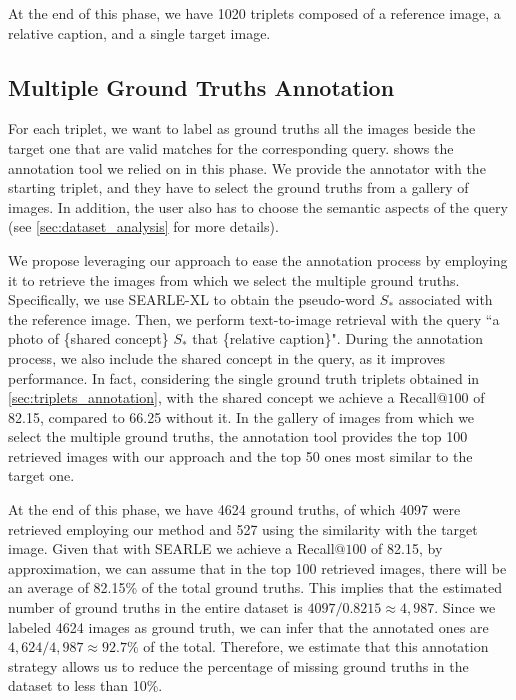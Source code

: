 \documentclass[10pt,twocolumn,letterpaper]{article}
\newcommand{\method}{SEARLE\xspace}
\begin{document}
At the end of this phase, we have 1020 triplets composed of a reference image, a relative caption, and a single target image.

\subsection{Multiple Ground Truths Annotation}\label{sec:multiple_gt_annotation}
For each triplet, we want to label as ground truths all the images beside the target one that are valid matches for the corresponding query.  shows the annotation tool we relied on in this phase. We provide the annotator with the starting triplet, and they have to select the ground truths from a gallery of images. In addition, the user also has to choose the semantic aspects of the query (see \cref{sec:dataset_analysis} for more details).

We propose leveraging our approach to ease the annotation process by employing it to retrieve the images from which we select the multiple ground truths.
Specifically, we use \method-XL to obtain the pseudo-word $S_*$ associated with the reference image. Then, we perform text-to-image retrieval with the query ``a photo of \{shared concept\} $S_*$ that \{relative caption\}". During the annotation process, we also include the shared concept in the query, as it improves performance. In fact, considering the single ground truth triplets obtained in \cref{sec:triplets_annotation}, with the shared concept we achieve a Recall$@100$ of 82.15, compared to 66.25 without it. In the gallery of images from which we select the multiple ground truths, the annotation tool provides the top 100 retrieved images with our approach and the top 50 ones most similar to the target one.

At the end of this phase, we have 4624 ground truths, of which 4097 were retrieved employing our method and 527 using the similarity with the target image. Given that with \method we achieve a Recall$@100$ of 82.15, by approximation, we can assume that in the top 100 retrieved images, there will be an average of 82.15\% of the total ground truths. This implies that the estimated number of ground truths in the entire dataset is $4097 / 0.8215 \approx 4,987$. Since we labeled 4624 images as ground truth, we can infer that the annotated ones are $4,624 / 4,987 \approx 92.7\%$ of the total. Therefore, we estimate that this annotation strategy allows us to reduce the percentage of missing ground truths in the dataset to less than 10\%.
\end{document}
